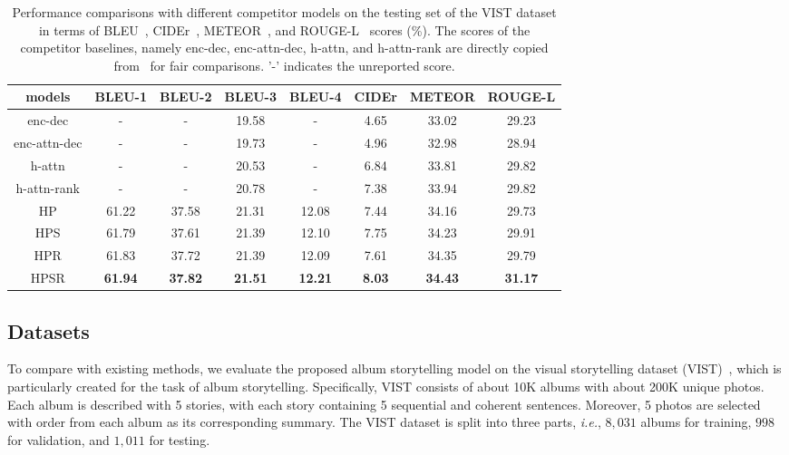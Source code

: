 \documentclass[letterpaper]{article} \usepackage{aaai19}  \usepackage{times}  \usepackage{helvet}  \usepackage{courier}  \usepackage{url}  \usepackage{graphicx}  \usepackage{color}
\begin{document}
\begin{table*}
\begin{center}
\caption{ Performance comparisons with different competitor models on the testing set of the VIST dataset in terms of BLEU~\cite{papineni2002bleu}, CIDEr~\cite{vedantam2015cider}, METEOR~\cite{banerjee2005meteor}, and ROUGE-L~\cite{lin2004rouge} scores (\%).
The scores of the competitor baselines, namely enc-dec, enc-attn-dec, h-attn, and h-attn-rank  are directly copied  from~\cite{yu2017hierarchically} for fair comparisons. '-' indicates the unreported score.}
\label{table:results1}
\begin{adjustbox}{width=0.7\textwidth}
\begin{tabular}{c|c|c|c|c|c|c|c}
\hline
models &BLEU-1  &BLEU-2  & BLEU-3  &BLEU-4 & CIDEr & METEOR  & ROUGE-L \\ \hline \hline
enc-dec & - & - & 19.58 & - & 4.65  & 33.02  &29.23  \\
enc-attn-dec  & - & - & 19.73 & - & 4.96&  32.98  & 28.94  \\
h-attn  & - & - & 20.53  & - & 6.84  & 33.81  & 29.82  \\
h-attn-rank  & - & - & 20.78  & - & 7.38 & 33.94  & 29.82  \\ \hline
HP  & 61.22 & 37.58  & 21.31 & 12.08  & 7.44 & 34.16 & 29.73 \\
HPS   & 61.79 & 37.61 & 21.39  & 12.10 & 7.75 & 34.23  & 29.91 \\
HPR   & 61.83 & 37.72 & 21.39  & 12.09 & 7.61 & 34.35  & 29.79  \\
HPSR  & \textbf{61.94} & \textbf{37.82} & \textbf{21.51}  & \textbf{12.21} & \textbf{8.03}  & \textbf{34.43}  & \textbf{31.17}  \\ \hline
\end{tabular}
\end{adjustbox}
\end{center}
\end{table*}

\subsection{Datasets}
To compare with existing methods, we evaluate the proposed album storytelling model on the visual storytelling dataset (VIST)~\cite{huang2016visual}, which is particularly created for the task of album storytelling.
Specifically, VIST consists of about 10K albums with about 200K unique photos. Each album is described with 5 stories, with each story containing 5 sequential and coherent sentences. Moreover, 5 photos are selected with order from each album as its corresponding summary.  The VIST dataset is split into three parts, \textit{i.e.}, $8,031$ albums for training, $998$ for validation, and $1,011$ for testing.
\end{document}
